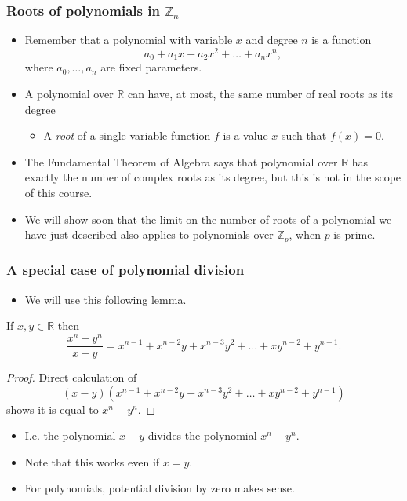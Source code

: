 \documentclass[handout]{beamer}
\newcommand{\bZ}{\mathbb{Z}}
\newcommand{\bR}{\mathbb{R}}
\begin{document}
\begin{frame}
\frametitle{Roots of polynomials in $\bZ_n$}
\begin{itemize}
\item  Remember that a polynomial with variable $x$ and degree $n$ is a function 
\[a_0 +a_1x +a_2x^2+\ldots +a_nx^n,\] 
where $a_0,\ldots,a_n$ are fixed parameters. 
\item A polynomial over $\bR$ can have, at most, the same number of real roots as its degree 
\begin{itemize} 
\item A \emph{root} of a single variable function $f$ is a value $x$ such that $f(x)=0$.
\end{itemize} 
\item The Fundamental Theorem of Algebra says that polynomial over $\bR$ has exactly the number of complex roots as its degree, but this is not in the scope of this course. 
\item We will show soon that the limit on the number of roots of a polynomial we have just described also applies to polynomials over $\bZ_p$, when $p$ is prime.
\end{itemize}
\end{frame}

\begin{frame}
\frametitle{A special case of polynomial division}
\begin{itemize}
\item We will use this following lemma.
\end{itemize}
\begin{lemma}\label{L:Lagdiv}
If $x,y\in\bR$ then 
\[\frac{x^n-y^n}{x-y} = x^{n-1} + x^{n-2}y + x^{n-3}y^2 + \ldots + x y^{n-2} + y^{n-1}.\]
\end{lemma}
\begin{proof}
Direct calculation of \[(x-y)(x^{n-1} + x^{n-2}y + x^{n-3}y^2 + \ldots + x y^{n-2} + y^{n-1})\] shows it is equal to $x^n-y^n$.
\end{proof}
\begin{itemize}
\item I.e. the polynomial $x-y$ divides the polynomial $x^n-y^n$.
\item Note that this works even if $x=y$.
\item For polynomials, potential division by zero makes sense.
\end{itemize}
\end{frame}
\end{document}
